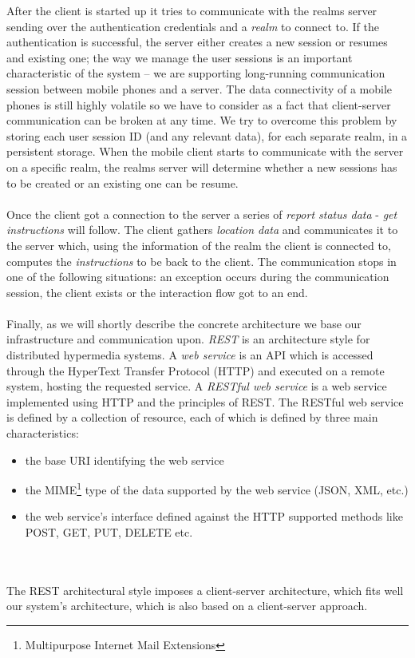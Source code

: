 After the client is started up it tries to communicate with the realms server sending over the authentication credentials and a \emph{realm} to connect to. If the authentication is successful, the server either creates a new session or resumes and existing one; the way we manage the user sessions is an important characteristic of the system -- we are supporting long-running communication session between mobile phones and a server. The data connectivity of a mobile phones is still highly volatile so we have to consider as a fact that client-server communication can be broken at any time. We try to overcome this problem by storing each user session ID (and any relevant data), for each separate realm, in a persistent storage. When the mobile client starts to communicate with the server on a specific realm, the realms server will determine whether a new sessions has to be created or an existing one can be resume.
\\\\
Once the client got a connection to the server a series of \emph{report status data} - \emph{get instructions} will follow. The client gathers \emph{location data} and communicates it to the server which, using the information of the realm the client is connected to, computes the \emph{instructions} to be back to the client. The communication stops in one of the following situations: an exception occurs during the communication session, the client exists or the interaction flow got to an end.
\\\\
Finally, as we will shortly describe the concrete architecture we base our infrastructure and communication upon. \emph{REST} is an architecture style for distributed hypermedia systems. A \emph{web service} is an API which is accessed through the HyperText Transfer Protocol (HTTP) and executed on a remote system, hosting the requested service. A \emph{RESTful web service} is a web service implemented using HTTP and the principles of REST. The RESTful web service is defined by a collection of resource, each of which is defined by three main characteristics:
\begin{itemize}
  \item the base URI identifying the web service
  \item the MIME\footnote{Multipurpose Internet Mail Extensions} type of the
  data supported by the web service (JSON, XML, etc.)
  \item the web service's interface defined against the HTTP supported methods
  like POST, GET, PUT, DELETE etc.
\end{itemize}
\\\\
The REST architectural style imposes a client-server architecture, which fits well our system's architecture, which is also based on a client-server approach.

